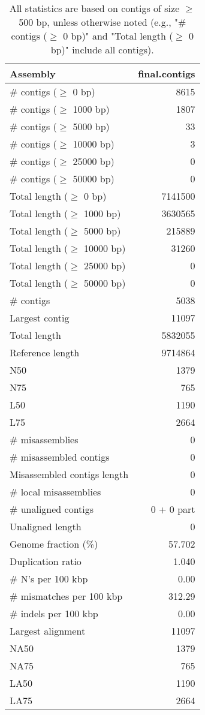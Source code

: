 \documentclass[12pt,a4paper]{article}
\begin{document}
\begin{table}[ht]
\begin{center}
\caption{All statistics are based on contigs of size $\geq$ 500 bp, unless otherwise noted (e.g., "\# contigs ($\geq$ 0 bp)" and "Total length ($\geq$ 0 bp)" include all contigs).}
\begin{tabular}{|l*{1}{|r}|}
\hline
Assembly & final.contigs \\ \hline
\# contigs ($\geq$ 0 bp) & 8615 \\ \hline
\# contigs ($\geq$ 1000 bp) & 1807 \\ \hline
\# contigs ($\geq$ 5000 bp) & 33 \\ \hline
\# contigs ($\geq$ 10000 bp) & 3 \\ \hline
\# contigs ($\geq$ 25000 bp) & 0 \\ \hline
\# contigs ($\geq$ 50000 bp) & 0 \\ \hline
Total length ($\geq$ 0 bp) & 7141500 \\ \hline
Total length ($\geq$ 1000 bp) & 3630565 \\ \hline
Total length ($\geq$ 5000 bp) & 215889 \\ \hline
Total length ($\geq$ 10000 bp) & 31260 \\ \hline
Total length ($\geq$ 25000 bp) & 0 \\ \hline
Total length ($\geq$ 50000 bp) & 0 \\ \hline
\# contigs & 5038 \\ \hline
Largest contig & 11097 \\ \hline
Total length & 5832055 \\ \hline
Reference length & 9714864 \\ \hline
N50 & 1379 \\ \hline
N75 & 765 \\ \hline
L50 & 1190 \\ \hline
L75 & 2664 \\ \hline
\# misassemblies & 0 \\ \hline
\# misassembled contigs & 0 \\ \hline
Misassembled contigs length & 0 \\ \hline
\# local misassemblies & 0 \\ \hline
\# unaligned contigs & 0 + 0 part \\ \hline
Unaligned length & 0 \\ \hline
Genome fraction (\%) & 57.702 \\ \hline
Duplication ratio & 1.040 \\ \hline
\# N's per 100 kbp & 0.00 \\ \hline
\# mismatches per 100 kbp & 312.29 \\ \hline
\# indels per 100 kbp & 0.00 \\ \hline
Largest alignment & 11097 \\ \hline
NA50 & 1379 \\ \hline
NA75 & 765 \\ \hline
LA50 & 1190 \\ \hline
LA75 & 2664 \\ \hline
\end{tabular}
\end{center}
\end{table}
\end{document}
